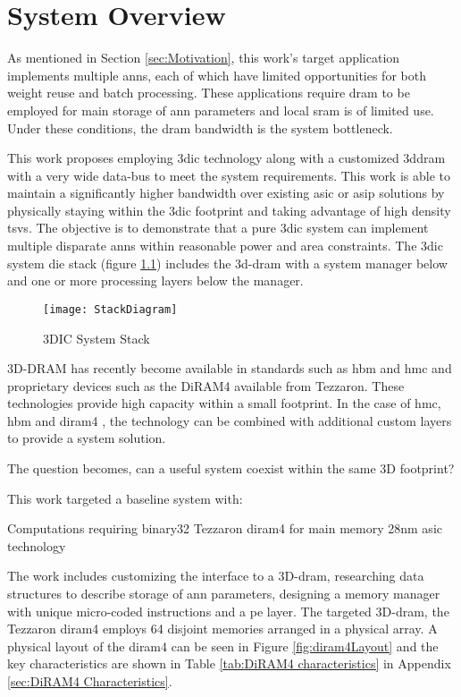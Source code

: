 



\chapter{System Overview}
\label{chap-five}
\label{sec:System Overview}
As mentioned in Section \ref{sec:Motivation}, this work's target application implements multiple \acp{ann}, each of which have limited opportunities for both weight reuse and batch processing.
These applications require \ac{dram} to be employed for main storage of \ac{ann} parameters and local \ac{sram} is of limited use.
Under these conditions, the \ac{dram} bandwidth is the system bottleneck.

This work proposes employing \ac{3dic} technology along with a customized \ac{3ddram} with a very wide data-bus to meet the system requirements. 
This work is able to maintain a significantly higher bandwidth over existing \ac{asic} or \ac{asip} solutions by physically staying within the \ac{3dic} footprint and taking advantage of high density \acp{tsv}.
The objective is to demonstrate that a pure \ac{3dic} system can implement multiple disparate \acp{ann} within reasonable power and area constraints. 
The \ac{3dic} system die stack (figure \ref{fig:3DICStack}) includes the \ac{3d}-\ac{dram} with a system manager below and one or more processing layers below the manager.
\begin{figure}[!t]
\centering
\captionsetup{justification=centering}
\captionsetup{width=.9\linewidth}
\centerline{
\mbox{\texttt{[image: StackDiagram]}}
}
\caption{3DIC System Stack}
\label{fig:3DICStack}
\end{figure}

3D-DRAM has recently become available in standards such as \ac{hbm} and \ac{hmc} and proprietary devices such as the DiRAM4 available from Tezzaron. 
These technologies provide high capacity within a small footprint.
In the case of \ac{hmc}, \ac{hbm} and \ac{diram4} \cite{tezzaron:diram4}, the technology can be combined with additional custom layers to provide a system solution.

The question becomes, can a useful system coexist within the same 3D footprint?

This work targeted a baseline system with:
\begin{outline}
  \1 Computations requiring \ac{binary32}
  \1 Tezzaron \acf{diram4} \cite{tezzaron:diram4} for main memory
  \1 28nm \ac{asic} technology
\end{outline}
The work includes customizing the interface to a 3D-\ac{dram}, researching data structures to describe storage of \ac{ann} parameters, designing a memory manager with unique micro-coded instructions and a \ac{pe} layer.  
The targeted 3D-\ac{dram}, the Tezzaron \ac{diram4} employs 64 disjoint memories arranged in a physical array.
A physical layout of the \ac{diram4} can be seen in Figure \ref{fig:diram4Layout} and the key characteristics are shown in Table \ref{tab:DiRAM4 characteristics} in Appendix \ref{sec:DiRAM4 Characteristics}. 


